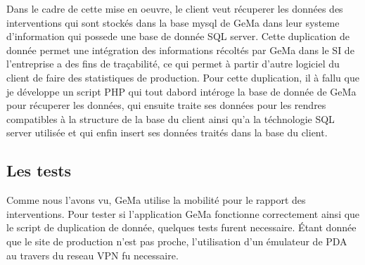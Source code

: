 Dans le cadre de cette mise en oeuvre, le client veut récuperer les
données des interventions qui sont stockés dans la base mysql de GeMa
dans leur systeme d'information qui possede une base de donnée SQL
server. Cette duplication de donnée permet une intégration des
informations récoltés par GeMa dans le SI de l'entreprise a des fins de
traçabilité, ce qui permet à partir d'autre logiciel du client de faire
des statistiques de production. Pour cette duplication, il à fallu que
je développe un script PHP qui tout dabord intéroge la base de donnée de
GeMa pour récuperer les données, qui ensuite traite ses données pour les
rendres compatibles à la structure de la base du client ainsi qu'a la
téchnologie SQL server utilisée et qui enfin insert ses données traités
dans la base du client.

\subsection{Les tests} %
\label{sub:Les tests}

Comme nous l'avons vu, GeMa utilise la mobilité pour le rapport des
interventions. Pour tester si l'application GeMa fonctionne correctement
ainsi que le script de duplication de donnée, quelques tests furent
necessaire. Étant donnée que le site de production n'est pas proche,
l'utilisation d'un émulateur de PDA au travers du reseau VPN fu
necessaire.

